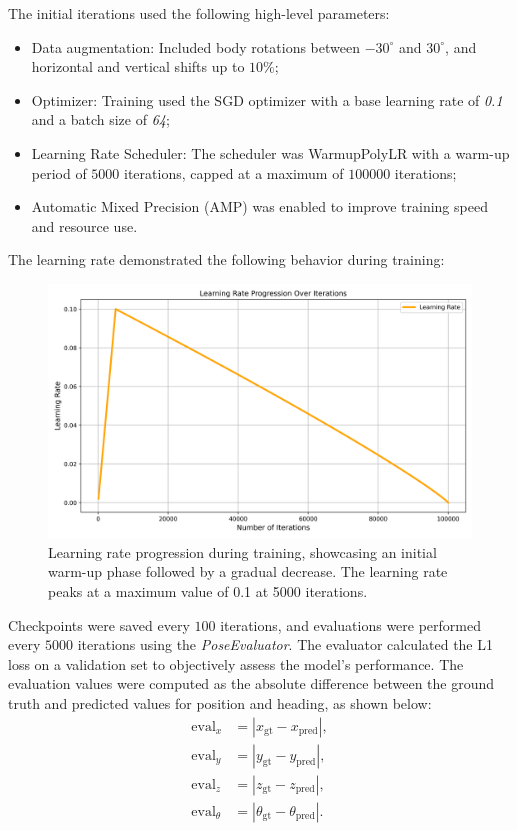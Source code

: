 The initial iterations used the following high-level parameters:
\begin{itemize}
    \item Data augmentation: Included body rotations between $-30^\circ$ and $30^\circ$, and horizontal and vertical shifts up to $10\%$;
    \item Optimizer: Training used the SGD optimizer with a base learning rate of \textit{0.1} and a batch size of \textit{64};
    \item Learning Rate Scheduler: The scheduler was WarmupPolyLR \cite{kalra2024warmuplearningrateunderlying} with a warm-up period of $5000$ iterations, capped at a maximum of $100000$ iterations;
    \item Automatic Mixed Precision (AMP) was enabled to improve training speed and resource use.
\end{itemize}

The learning rate demonstrated the following behavior during training:
\begin{figure}[H]
    \centering
    \includegraphics[width=0.75\linewidth]{LateX//figs/learning_rate_progression.png}
    \caption{Learning rate progression during training, showcasing an initial warm-up phase followed by a gradual decrease. The learning rate peaks at a maximum value of 0.1 at 5000 iterations.}
    \label{fig:learning-rate-progression}
\end{figure}

Checkpoints were saved every $100$ iterations, and evaluations were performed every $5000$ iterations using the \textit{PoseEvaluator}. The evaluator calculated the L1 loss on a validation set to objectively assess the model’s performance. The evaluation values were computed as the absolute difference between the ground truth and predicted values for position and heading, as shown below:
\begin{align}
    \text{eval}_x &= |x_{\text{gt}} - x_{\text{pred}}|, \\
    \text{eval}_y &= |y_{\text{gt}} - y_{\text{pred}}|, \\
    \text{eval}_z &= |z_{\text{gt}} - z_{\text{pred}}|, \\
    \text{eval}_{\theta} &= |\theta_{\text{gt}} - \theta_{\text{pred}}|.
\end{align}

